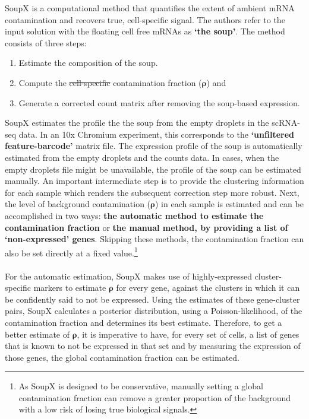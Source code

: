 SoupX is a computational method that quantifies the extent of ambient mRNA contamination and recovers true, cell-specific signal. The authors refer to the input solution with the floating cell free mRNAs as \textbf{‘the soup’}. The method consists of three steps:
\begin{enumerate}
    \item Estimate the composition of the soup.
    \item Compute the \st{cell-specific} contamination fraction ($\mathbf{\rho}$) and
    \item Generate a corrected count matrix after removing the soup-based expression.
\end{enumerate}
SoupX estimates the profile the the soup from the empty droplets in the scRNA-seq data. In an 10x Chromium experiment, this corresponds to the \textbf{‘unfiltered feature-barcode’} matrix file. The expression profile of the soup is automatically estimated from the empty droplets and the counts data. In cases, when the empty droplets file might be unavailable, the profile of the soup can be estimated manually. An important intermediate step is to provide the clustering information for each sample which renders the subsequent correction step more robust. Next, the level of background contamination ($\mathbf{\rho}$) in each sample is estimated and can be accomplished in two ways: \textbf{the automatic method to estimate the contamination fraction} or \textbf{the manual method, by providing a list of ‘non-expressed’ genes}. Skipping these methods, the contamination fraction can also be set directly at a fixed value.\footnote{As SoupX is designed to be conservative, manually setting a global contamination fraction can remove a greater proportion of the background with a low risk of losing true biological signals.}\\\\
For the automatic estimation, SoupX makes use of highly-expressed cluster-specific markers to estimate $\mathbf{\rho}$ for every gene, against the clusters in which it can be confidently said to not be expressed. Using the estimates of these gene-cluster pairs, SoupX calculates a posterior distribution, using a Poisson-likelihood, of the contamination fraction and determines its best estimate. Therefore, to get a better estimate of $\mathbf{\rho}$, it is imperative to have, for every set of cells, a list of genes that is known to not be expressed in that set and by measuring the expression of those genes, the global contamination fraction can be estimated.
\clearpage

